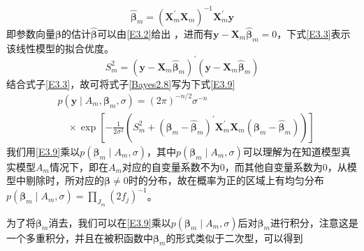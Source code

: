 \documentclass[12pt]{article} %
\begin{document}
	\begin{equation}
		\hat{\boldsymbol{\beta}}_{m}=\left(\mathbf{X}_{m}^{\prime} \mathbf{X}_{m}\right)^{-1} \mathbf{X}_{m}^{\prime} \mathbf{y} \label{E3.2}
	\end{equation}
	即参数向量$\boldsymbol{\beta}$的估计$\hat{\boldsymbol{\beta}}$可以由\eqref{E3.2}给出
	，进而有$\mathbf{y}-\mathbf{X}_m\hat{\boldsymbol{\beta}}_{m}=0$，下式\eqref{E3.3}表示该线性模型的拟合优度。
	\begin{equation}
		S_{m}^{2}=\left(\mathbf{y}-\mathbf{X}_{m} \label{E3.3} \hat{\boldsymbol{\beta}}_{m}\right)^{\prime}\left(\mathbf{y}-\mathbf{X}_{m} \hat{\boldsymbol{\beta}}_{m}\right)
	\end{equation}
	结合式子\eqref{E3.3}，故可将式子\eqref{Bayes2.8}写为下式\eqref{E3.9}
	\begin{equation}
		\begin{aligned}
			&p\left(\mathbf{y} \mid A_{m}, \boldsymbol{\beta}_{m}, \sigma\right)=(2 \pi)^{-n / 2} \sigma^{-n} \\
			&\quad \times \exp \left[-\frac{1}{2 \sigma^{2}}\left(S_{m}^{2}+\left(\boldsymbol{\beta}_{m}-\hat{\boldsymbol{\beta}}_{m}\right)^{\prime} \mathbf{X}_{m}^{\prime} \mathbf{X}_{m}\left(\boldsymbol{\beta}_{m}-\hat{\boldsymbol{\beta}}_{m}\right)\right)\right] \label{E3.9}
		\end{aligned}
	\end{equation}
	我们用\eqref{E3.9}乘以$p(\boldsymbol{\beta}_m \mid A_m,\sigma)$，其中$p(\boldsymbol{\beta}_m \mid A_m,\sigma)$可以理解为在知道模型真实模型$A_m$情况下，即在$A_m$对应的自变量系数不为0，而其他自变量系数为0，从模型中剔除时，所对应的$\boldsymbol{\beta}\neq 0$时的分布，故在概率为正的区域上有均匀分布$p(\boldsymbol{\beta}_m \mid A_m,\sigma)=\prod_{J_{m}}\left(2 f_{j}\right)^{-1} $。
	
	为了将$\boldsymbol{\beta}_m$消去，我们可以在\eqref{E3.9}乘以$p(\boldsymbol{\beta}_m \mid A_m,\sigma)$后对$\boldsymbol{\beta}_m$进行积分，注意这是一个多重积分，并且在被积函数中$\boldsymbol{\beta}_m$的形式类似于二次型，可以得到
	
\end{document}
